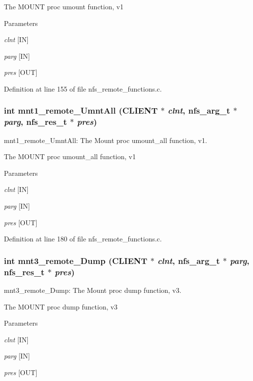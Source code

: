 The MOUNT proc umount function, v1


\begin{DoxyParams}{Parameters}
\item[{\em clnt}][IN] \item[{\em parg}][IN] \item[{\em pres}][OUT] \end{DoxyParams}


Definition at line 155 of file nfs\_\-remote\_\-functions.c.
\subsubsection[{mnt1\_\-remote\_\-UmntAll}]{\setlength{\rightskip}{0pt plus 5cm}int mnt1\_\-remote\_\-UmntAll (CLIENT $\ast$ {\em clnt}, \/  nfs\_\-arg\_\-t $\ast$ {\em parg}, \/  nfs\_\-res\_\-t $\ast$ {\em pres})}\label{group__MNTprocs_ga210e44facdf641082e0d0c030751d1ad}
mnt1\_\-remote\_\-UmntAll: The Mount proc umount\_\-all function, v1.

The MOUNT proc umount\_\-all function, v1


\begin{DoxyParams}{Parameters}
\item[{\em clnt}][IN] \item[{\em parg}][IN] \item[{\em pres}][OUT] \end{DoxyParams}


Definition at line 180 of file nfs\_\-remote\_\-functions.c.
\subsubsection[{mnt3\_\-remote\_\-Dump}]{\setlength{\rightskip}{0pt plus 5cm}int mnt3\_\-remote\_\-Dump (CLIENT $\ast$ {\em clnt}, \/  nfs\_\-arg\_\-t $\ast$ {\em parg}, \/  nfs\_\-res\_\-t $\ast$ {\em pres})}\label{group__MNTprocs_gafb40d52403d9e2402412ec40e47c2090}
mnt3\_\-remote\_\-Dump: The Mount proc dump function, v3.

The MOUNT proc dump function, v3


\begin{DoxyParams}{Parameters}
\item[{\em clnt}][IN] \item[{\em parg}][IN] \item[{\em pres}][OUT] \end{DoxyParams}


